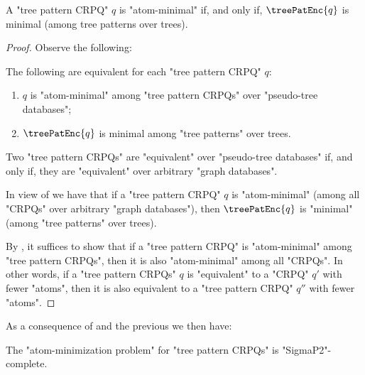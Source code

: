 \begin{lemma}\AP\label{lem:treepat-crpq}
  A "tree pattern CRPQ" $q$ is "atom-minimal" if, and only if, $\treePatEnc{q}$ is minimal (among tree patterns over trees).
\end{lemma}
\begin{proof}
  Observe the following:
  \begin{claim}\AP\label{cl:atommin-over-trees=treepatmin}
    The following are equivalent for each "tree pattern CRPQ" $q$:
    \begin{enumerate}
      \item $q$ is "atom-minimal" among "tree pattern CRPQs" over "pseudo-tree databases";
      \item $\treePatEnc{q}$ is minimal among "tree patterns" over trees.
    \end{enumerate}  
  \end{claim}
  \begin{claim}\AP\label{cl:equiv-overtrees-overgraphs}
    Two "tree pattern CRPQs" are "equivalent" over "pseudo-tree databases" if, and only if, they are "equivalent" over arbitrary "graph databases".
  \end{claim}
  In view of  we have that
    if a "tree pattern CRPQ" $q$ is "atom-minimal" (among all "CRPQs" over arbitrary "graph databases"), then $\treePatEnc{q}$ is "minimal" (among "tree patterns" over trees).

  By , it suffices to show that if a "tree pattern CRPQ" is "atom-minimal" among "tree pattern CRPQs", then it is also "atom-minimal" among all "CRPQs". In other words, if a "tree pattern CRPQs" $q$ is "equivalent" to a "CRPQ" $q'$ with fewer "atoms", then it is also equivalent to a "tree pattern CRPQ" $q''$ with fewer "atoms".
\end{proof}

As a consequence of \cite[Theorem~3.1]{CzerwinskiMartensNiewerthParys2018Minimization} and the previous  we then have:
\begin{corollary}
  The "atom-minimization problem" for "tree pattern CRPQs" is "SigmaP2"-complete.
\end{corollary}